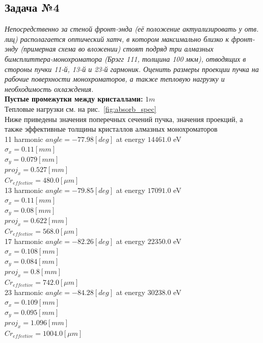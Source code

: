 \documentclass[14pt,a4paper]{extarticle}
\numberwithin{equation}{section}
\begin{document}
\subsection{Задача №4}
\textit{Непосредственно за стеной фронт-энда (её положение актуализировать у отв. лиц) располагается оптический хатч, в котором максимально близко к фронт-энду (примерная схема во вложении) стоят подряд три алмазных бимсплиттера-монохроматора (Брэгг 111, толщина 100 мкм), отводящих в стороны пучки 11-й, 13-й и 23-й гармоник. Оценить размеры проекции пучка на рабочие поверхности монохроматоров, а также тепловую нагрузку и необходимость охлаждения.}\\
\textbf{Пустые промежутки между кристаллами:} $1m$\\
Тепловые нагрузки см. на рис.~\ref{fig:absorb_spec}\\
Ниже приведены значения поперечных сечений пучка, значения проекций, а также эффективные толщины кристаллов алмазных монохроматоров\\
11 harmonic  $angle =  -77.98 [deg]$ at energy $14461.0$ eV\\ 
$\sigma_x =  0.11 [mm]$\\ 
$\sigma_y =  0.079 [mm]$\\ 
$proj_x  =  0.527 [mm]$\\ 
$Cr_{effective}  =  480.0 [\mu m]$\\
13 harmonic  $angle =  -79.85 [deg]$ at energy $17091.0$ eV\\ 
$\sigma_x =  0.11 [mm]$\\ 
$\sigma_y =  0.08 [mm]$\\ 
$proj_x  =  0.622 [mm]$\\ 
$Cr_{effective}  =  568.0 [\mu m]$\\
17 harmonic  $angle =  -82.26 [deg]$ at energy $22350.0$ eV\\ 
$\sigma_x =  0.108 [mm]$\\ 
$\sigma_y =  0.084 [mm]$\\ 
$proj_x  =  0.8 [mm]$\\ 
$Cr_{effective}  =  742.0 [\mu m]$\\
23 harmonic  $angle =  -84.28 [deg]$ at energy $30238.0$ eV\\ 
$\sigma_x =  0.109 [mm]$\\ 
$\sigma_y =  0.095 [mm]$\\ 
$proj_x  =  1.096 [mm]$\\ 
$Cr_{effective}  =  1004.0 [\mu m]$\\
\end{document}
